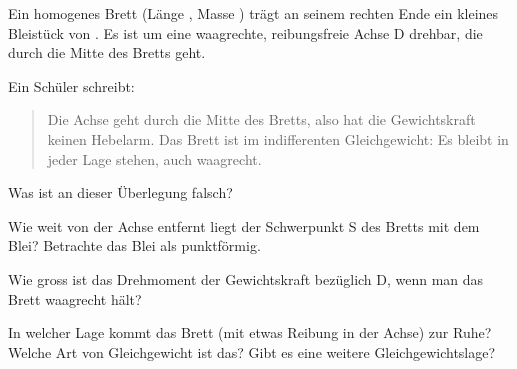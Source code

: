 Ein homogenes Brett (Länge \LBO, Masse \mBO) trägt an seinem rechten Ende ein kleines Bleistück von \mPbO. Es ist um eine waagrechte, reibungsfreie Achse D drehbar, die durch die Mitte des Bretts geht.
\begin{center}
\end{center}
Ein Schüler schreibt:

\begin{quote}
Die Achse geht durch die Mitte des Bretts, also hat die Gewichtskraft keinen Hebelarm. Das Brett ist im indifferenten Gleichgewicht: Es bleibt in jeder Lage stehen, auch waagrecht.
\end{quote}

\begin{abcliste}
\abc
Was ist an dieser Überlegung falsch?

\abc
Wie weit von der Achse entfernt liegt der Schwerpunkt S des Bretts mit dem Blei? Betrachte das Blei als punktförmig.

\abc
Wie gross ist das Drehmoment der Gewichtskraft bezüglich D, wenn man das Brett waagrecht hält?

\abc
In welcher Lage kommt das Brett (mit etwas Reibung in der Achse) zur Ruhe? Welche Art von Gleichgewicht ist das? Gibt es eine weitere Gleichgewichtslage?
\end{abcliste}
